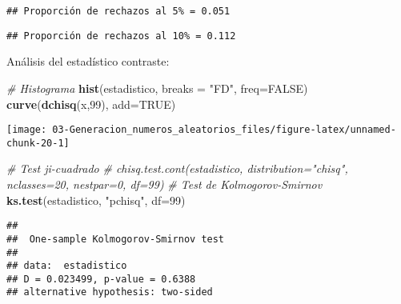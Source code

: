 \documentclass[
]{book}
\newenvironment{Shaded}{\begin{snugshade}}{\end{snugshade}}
\newcommand{\CharTok}[1]{\textcolor[rgb]{0.31,0.60,0.02}{#1}}
\newcommand{\CommentTok}[1]{\textcolor[rgb]{0.56,0.35,0.01}{\textit{#1}}}
\newcommand{\DataTypeTok}[1]{\textcolor[rgb]{0.13,0.29,0.53}{#1}}
\newcommand{\DecValTok}[1]{\textcolor[rgb]{0.00,0.00,0.81}{#1}}
\newcommand{\FloatTok}[1]{\textcolor[rgb]{0.00,0.00,0.81}{#1}}
\newcommand{\KeywordTok}[1]{\textcolor[rgb]{0.13,0.29,0.53}{\textbf{#1}}}
\newcommand{\NormalTok}[1]{#1}
\newcommand{\OperatorTok}[1]{\textcolor[rgb]{0.81,0.36,0.00}{\textbf{#1}}}
\newcommand{\OtherTok}[1]{\textcolor[rgb]{0.56,0.35,0.01}{#1}}
\newcommand{\StringTok}[1]{\textcolor[rgb]{0.31,0.60,0.02}{#1}}
\theoremstyle{break}
\theoremstyle{definition}
\theoremstyle{definition}
\theoremstyle{definition}
\theoremstyle{remark}
\begin{document}
\begin{verbatim}
## Proporción de rechazos al 5% = 0.051
\end{verbatim}

\begin{Shaded}
\end{Shaded}

\begin{verbatim}
## Proporción de rechazos al 10% = 0.112
\end{verbatim}

Análisis del estadístico contraste:

\begin{Shaded}
\begin{Highlighting}[]
\CommentTok{# Histograma}
\KeywordTok{hist}\NormalTok{(estadistico, }\DataTypeTok{breaks =} \StringTok{"FD"}\NormalTok{, }\DataTypeTok{freq=}\OtherTok{FALSE}\NormalTok{)}
\KeywordTok{curve}\NormalTok{(}\KeywordTok{dchisq}\NormalTok{(x,}\DecValTok{99}\NormalTok{), }\DataTypeTok{add=}\OtherTok{TRUE}\NormalTok{)}
\end{Highlighting}
\end{Shaded}

\begin{center}\texttt{[image: 03-Generacion\_numeros\_aleatorios\_files/figure-latex/unnamed-chunk-20-1]} \end{center}

\begin{Shaded}
\begin{Highlighting}[]
\CommentTok{# Test ji-cuadrado}
\CommentTok{# chisq.test.cont(estadistico, distribution="chisq", nclasses=20, nestpar=0, df=99)}
\CommentTok{# Test de Kolmogorov-Smirnov}
\KeywordTok{ks.test}\NormalTok{(estadistico, }\StringTok{"pchisq"}\NormalTok{, }\DataTypeTok{df=}\DecValTok{99}\NormalTok{)}
\end{Highlighting}
\end{Shaded}

\begin{verbatim}
## 
##  One-sample Kolmogorov-Smirnov test
## 
## data:  estadistico
## D = 0.023499, p-value = 0.6388
## alternative hypothesis: two-sided
\end{verbatim}
\end{document}
